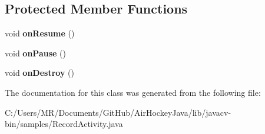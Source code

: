 \subsection*{Protected Member Functions}
\begin{DoxyCompactItemize}
\item 
\hypertarget{classorg_1_1bytedeco_1_1javacv_1_1recordactivity_1_1_record_activity_a3755d6c12db1797f04f3da50898f2138}{}void {\bfseries on\+Resume} ()\label{classorg_1_1bytedeco_1_1javacv_1_1recordactivity_1_1_record_activity_a3755d6c12db1797f04f3da50898f2138}

\item 
\hypertarget{classorg_1_1bytedeco_1_1javacv_1_1recordactivity_1_1_record_activity_a743187cbbd1ef06e750b45795044c65a}{}void {\bfseries on\+Pause} ()\label{classorg_1_1bytedeco_1_1javacv_1_1recordactivity_1_1_record_activity_a743187cbbd1ef06e750b45795044c65a}

\item 
\hypertarget{classorg_1_1bytedeco_1_1javacv_1_1recordactivity_1_1_record_activity_a46cc0d1124b8d4be552cc900991a11d1}{}void {\bfseries on\+Destroy} ()\label{classorg_1_1bytedeco_1_1javacv_1_1recordactivity_1_1_record_activity_a46cc0d1124b8d4be552cc900991a11d1}

\end{DoxyCompactItemize}


The documentation for this class was generated from the following file\+:\begin{DoxyCompactItemize}
\item 
C\+:/\+Users/\+M\+R/\+Documents/\+Git\+Hub/\+Air\+Hockey\+Java/lib/javacv-\/bin/samples/Record\+Activity.\+java\end{DoxyCompactItemize}
